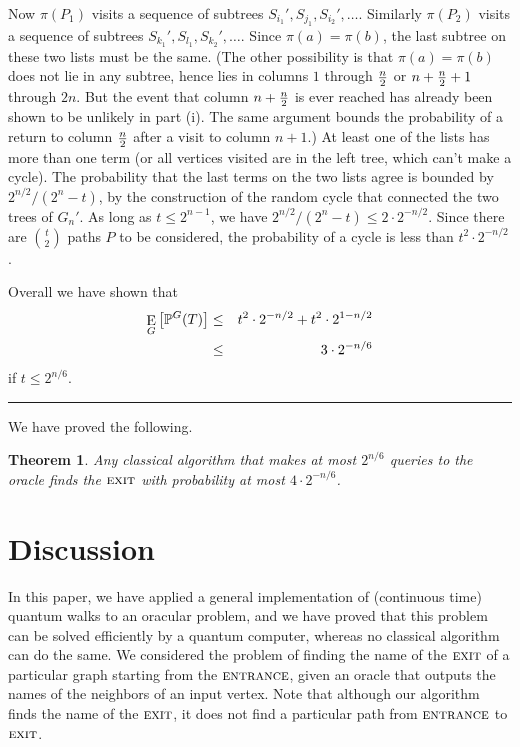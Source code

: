 \documentclass[aps,11pt,twoside,nofootinbib,tightenlines,superscriptaddress,preprintnumbers]{revtex4}
\newcommand{\<}{\langle}
\renewcommand{\>}{\rangle}
\newcommand{\bea}{\begin{eqnarray}}
\newcommand{\eea}{\end{eqnarray}}
\newcommand{\ent}{{\textsc{entrance}}}
\newcommand{\exit}{{\textsc{exit}}}
\newcommand\symExpec{\mathop{\mathrm{E}}\displaylimits}
\def\expec#1#2{\symExpec_{#1}\left[ #2 \right]}
\newtheorem{theorem}{Theorem}
\newcommand{\qed}{\rule{7pt}{7pt}}
\newenvironment{proof}
  {\trivlist\item\noindent{\bf Proof}~}
  {\qed\endtrivlist}
\begin{document}
\begin{proof}
\begin{enumerate}
Now $\pi(P_1)$ visits a sequence of subtrees
$S_{i_1}',S_{j_1},S_{i_2}',\ldots$.  Similarly $\pi(P_2)$ visits a
sequence of subtrees $S_{k_1}',S_{l_1},S_{k_2}',\ldots$.  Since
$\pi(a)=\pi(b)$, the last subtree on these two lists must be the same.
%
(The other possibility is that $\pi(a)=\pi(b)$ does not lie in any
subtree, hence lies in columns $1$ through $n \over 2$ or $n+{n \over
2}+1$ through $2n$.  But the event that column $n+{n \over 2}$ is ever
reached has already been shown to be unlikely in part (i).  The same
argument bounds the probability of a return to column $n \over 2$ after a
visit to column $n+1$.)
%
At least one of the lists has more than one term (or all vertices visited
are in the left tree, which can't make a cycle).  The probability that the
last terms on the two lists agree is bounded by $2^{n/2}/(2^n-t)$, by the
construction of the random cycle that connected the two trees of $G_n'$.
As long as $t\le 2^{n-1}$, we have $2^{n/2}/(2^n-t)\le 2\cdot 2^{-n/2}$.
Since there are $t \choose 2$ paths $P$ to be considered, the probability
of a cycle is less than $t^2 \cdot 2^{-n/2}$.
\end{enumerate}
Overall we have shown that
\bea
  \expec{G}{\mathbb{P}^G(T)} 
    &\le& t^2 \cdot 2^{-n/2} + t^2 \cdot 2^{1-n/2} \\
    &\le& 3 \cdot 2^{-n/6}
\eea
if $t \le 2^{n/6}$.
\end{proof}

We have proved the following.

\begin{theorem}
Any classical algorithm that makes at most $2^{n/6}$ queries to the oracle
finds the $\exit$ with probability at most $4 \cdot 2^{-n/6}$.
\end{theorem}

\section{Discussion}\label{sec:discussion}

In this paper, we have applied a general implementation of (continuous
time) quantum walks to an oracular problem, and we have proved that this
problem can be solved efficiently by a quantum computer, whereas no
classical algorithm can do the same.  We considered the problem of finding
the name of the $\exit$ of a particular graph starting from the $\ent$,
given an oracle that outputs the names of the neighbors of an input
vertex.  Note that although our algorithm finds the name of the $\exit$,
it does not find a particular path from $\ent$ to $\exit$.
\end{document}
